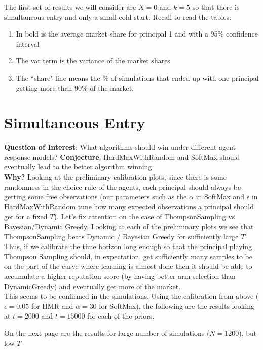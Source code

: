 \documentclass[11pt,letterpaper]{article}
\begin{document}
The first set of results we will consider are $X = 0$ and $k = 5$ so that there is simultaneous entry and only a small cold start. Recall to read the tables: \\
\begin{enumerate}
\item In bold is the average market share for principal 1 and with a 95\% confidence interval
\item The var term is the variance of the market shares
\item The ``share" line means the \% of simulations that ended up with one principal getting more than 90\% of the market.
\end{enumerate}

\section*{Simultaneous Entry}

\textbf{Question of Interest}: What algorithms should win under different agent response models?
\textbf{Conjecture}: HardMaxWithRandom and SoftMax should eventually lead to the better algorithm winning. \\
\textbf{Why?} Looking at the preliminary calibration plots, since there is some randomness in the choice rule of the agents, each principal should always be getting some free observations (our parameters such as the $\alpha$ in SoftMax and $\epsilon$ in HardMaxWithRandom tune how many expected observations a principal should get for a fixed $T$).  Let's fix attention on the case of ThompsonSampling vs Bayesian/Dynamic Greedy. Looking at each of the preliminary plots we see that ThompsonSampling beats Dynamic / Bayesian Greedy for sufficiently large $T$. Thus, if we calibrate the time horizon long enough so that the principal playing Thompson Sampling should, in expectation, get sufficiently many samples to be on the part of the curve where learning is almost done then it should be able to accumulate a higher reputation score (by having better arm selection than DynamicGreedy) and eventually get more of the market. \\

This seems to be confirmed in the simulations. Using the calibration from above ($\epsilon = 0.05$ for HMR and $\alpha = 30$ for SoftMax), the following are the results looking at $t = 2000$ and $t = 15000$ for each of the priors.



On the next page are the results for large number of simulations ($N=1200$), but low $T$ \\
\end{document}
